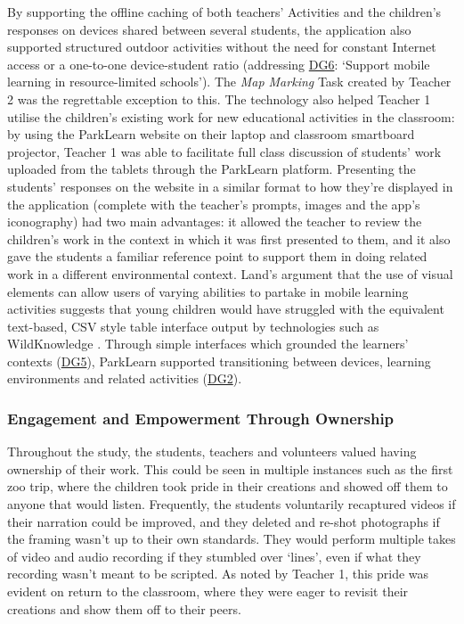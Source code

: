 By supporting the offline caching of both teachers’ Activities and the children’s responses on devices shared between several students, the application also supported structured outdoor activities without the need for constant Internet access or a one-to-one device-student ratio (addressing \hyperref[DG6]{DG6}: `Support mobile learning in resource-limited schools'). The \textit{Map Marking} Task created by Teacher 2 was the regrettable exception to this. The technology also helped Teacher 1 utilise the children’s existing work for new educational activities in the classroom: by using the ParkLearn website on their laptop and classroom smartboard projector, Teacher 1 was able to facilitate full class discussion of students’ work uploaded from the tablets through the ParkLearn platform. Presenting the students’ responses on the website in a similar format to how they’re displayed in the application (complete with the teacher’s prompts, images and the app’s iconography) had two main advantages: it allowed the teacher to review the children’s work in the context in which it was first presented to them, and it also gave the students a familiar reference point to support them in doing related work in a different environmental context. Land’s argument that the use of visual elements can allow users of varying abilities to partake in mobile learning activities \citep{Land2015} suggests that young children would have struggled with the equivalent text-based, CSV style table interface output by technologies such as WildKnowledge \citep{WildKnowledge2015}. Through simple interfaces which grounded the learners' contexts (\hyperref[DG5]{DG5}), ParkLearn supported transitioning between devices, learning environments and related activities (\hyperref[DG2]{DG2}). 

\subsubsection{Engagement and Empowerment Through Ownership} 

Throughout the study, the students, teachers and volunteers valued having ownership of their work. This could be seen in multiple instances such as the first zoo trip, where the children took pride in their creations and showed off them to anyone that would listen. Frequently, the students voluntarily recaptured videos if their narration could be improved, and they deleted and re-shot photographs if the framing wasn't up to their own standards. They would perform multiple takes of video and audio recording if they stumbled over `lines', even if what they recording wasn't meant to be scripted. As noted by Teacher 1, this pride was evident on return to the classroom, where they were eager to revisit their creations and show them off to their peers. 

